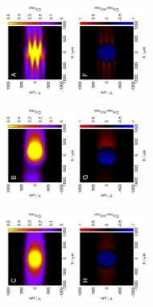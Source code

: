 \documentclass[3p]{elsarticle}
\begin{document}
\begin{figure}
\centering
\includegraphics[trim = 20mm 30mm 0mm 20mm, clip, width=0.2\textwidth, angle=-90]{meander_sim.eps} \includegraphics[trim = 20mm 30mm 0mm 20mm, clip, width=0.2\textwidth, angle=-90]{meander_delta.eps}

\includegraphics[trim = 20mm 30mm 0mm 20mm, clip, width=0.2\textwidth, angle=-90]{fastcomb_sim.eps} \includegraphics[trim = 20mm 30mm 0mm 20mm, clip, width=0.2\textwidth, angle=-90]{fastcomb_delta.eps}

\includegraphics[trim = 20mm 30mm 0mm 20mm, clip, width=0.2\textwidth, angle=-90]{comb_sim.eps} \includegraphics[trim = 20mm 30mm 0mm 20mm, clip, width=0.2\textwidth, angle=-90]{comb_delta.eps}


\end{figure}
\end{document}
